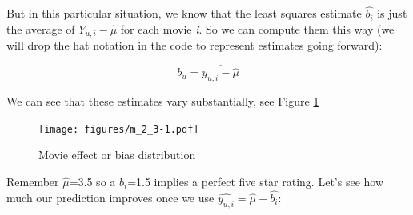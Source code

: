 \documentclass[
]{article}
\newenvironment{Shaded}{}{}
\newcommand{\AttributeTok}[1]{\textcolor[rgb]{0.49,0.56,0.16}{#1}}
\newcommand{\DecValTok}[1]{\textcolor[rgb]{0.25,0.63,0.44}{#1}}
\newcommand{\FloatTok}[1]{\textcolor[rgb]{0.25,0.63,0.44}{#1}}
\newcommand{\FunctionTok}[1]{\textcolor[rgb]{0.02,0.16,0.49}{#1}}
\newcommand{\NormalTok}[1]{#1}
\newcommand{\OtherTok}[1]{\textcolor[rgb]{0.00,0.44,0.13}{#1}}
\newcommand{\SpecialCharTok}[1]{\textcolor[rgb]{0.25,0.44,0.63}{#1}}
\newcommand{\StringTok}[1]{\textcolor[rgb]{0.25,0.44,0.63}{#1}}
\begin{document}
But in this particular situation, we know that the least squares
estimate \(\hat{b_{i}}\) is just the average of \(Y_{u,i}-\hat{\mu}\)
for each movie \emph{i}. So we can compute them this way (we will drop
the hat notation in the code to represent estimates going forward):

%
\par

\label{eq:EqModel2-3} \begin{equation}
  b_{u} = \overline{y_{u,i} - \hat{\mu}}
\end{equation}

\begin{Shaded}
\end{Shaded}

\newpage

We can see that these estimates vary substantially, see Figure
\ref{fig:model_2}

\begin{figure}
\centering
\texttt{[image: figures/m\_2\_3-1.pdf]}
\caption{Movie effect or bias distribution\label{fig:model_2}}
\end{figure}

Remember \(\hat{\mu}\)=3.5 so a \(b_{i}\)=1.5 implies a perfect five
star rating. Let's see how much our prediction improves once we use
\(\hat{y_{u,i}}=\hat{\mu}+\hat{b_{i}}\):

\begin{Shaded}
\end{Shaded}
\end{document}
